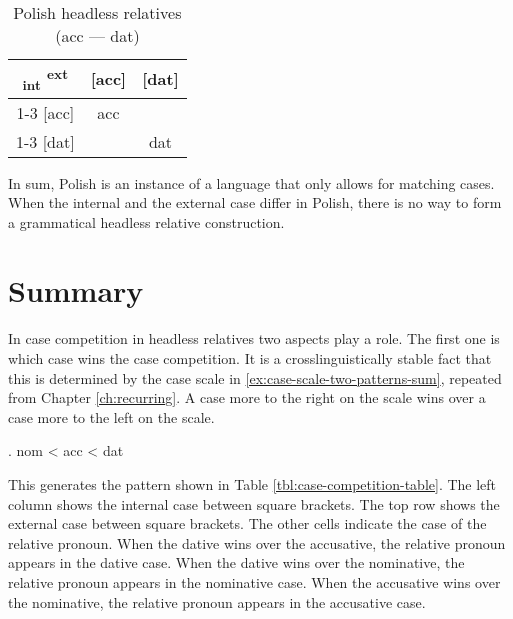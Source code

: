 \begin{table}[ht]
  \center
  \caption{Polish headless relatives (\ac{acc} --- \ac{dat})}
  \begin{tabular}{c|c|c}
    \toprule
    \textsubscript{\ac{int}} \textsuperscript{\ac{ext}}
           & [\ac{acc}]
           & [\ac{dat}]
           \\ \cmidrule{1-3}
       [\ac{acc}]
           & \ac{acc}
           & \cellcolor{DG}{*}
           \\ \cmidrule{1-3}
       [\ac{dat}]
           & \cellcolor{LG}{*}
           & \ac{dat}
           \\
     \bottomrule
  \end{tabular}
    \label{tbl:summary-polish-acc-dat}
\end{table}

In sum, Polish is an instance of a language that only allows for matching cases. When the internal and the external case differ in Polish, there is no way to form a grammatical headless relative construction.

\section{Summary}\label{sec:summary-3-patterns}

In case competition in headless relatives two aspects play a role. The first one is which case wins the case competition. It is a crosslinguistically stable fact that this is determined by the case scale in \ref{ex:case-scale-two-patterns-sum}, repeated from Chapter \ref{ch:recurring}. A case more to the right on the scale wins over a case more to the left on the scale.

\ex. \ac{nom} < \ac{acc} < \ac{dat}\label{ex:case-scale-two-patterns-sum}

This generates the pattern shown in Table \ref{tbl:case-competition-table}. The left column shows the internal case between square brackets. The top row shows the external case between square brackets. The other cells indicate the case of the relative pronoun. When the dative wins over the accusative, the relative pronoun appears in the dative case. When the dative wins over the nominative, the relative pronoun appears in the nominative case. When the accusative wins over the nominative, the relative pronoun appears in the accusative case.


